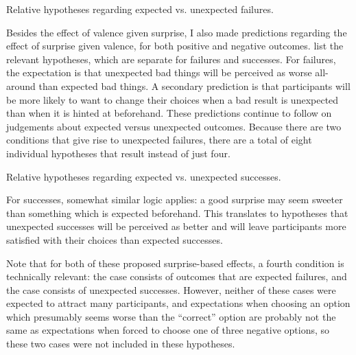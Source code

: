 \begin{table}[tb]
\centering
\bgroup
\def\arraystretch{1.3}
\setlength{\tabcolsep}{0.6em}

\egroup
\caption[Retrospective expected vs\@. unexpected failure hypotheses]{Relative hypotheses regarding expected vs\@. unexpected failures.}
\label{tab:e2-expected-vs-unexpected-failure-hypotheses}
\end{table}

Besides the effect of valence given surprise, I also made predictions regarding the effect of surprise given valence, for both positive and negative outcomes.
%
 list the relevant hypotheses, which are separate for failures and successes.
%
For failures, the expectation is that unexpected bad things will be perceived as worse all-around than expected bad things.
%
A secondary prediction is that participants will be more likely to want to change their choices when a bad result is unexpected than when it is hinted at beforehand.
%
These predictions continue to follow \citep{Shepperd2002} on judgements about expected versus unexpected outcomes.
%
Because there are two conditions that give rise to unexpected failures, there are a total of eight individual hypotheses that result instead of just four.

\begin{table}[tb]
\centering
\bgroup
\def\arraystretch{1.3}
\setlength{\tabcolsep}{0.6em}

\egroup
\caption[Retrospective expected vs\@. unexpected success hypotheses]{Relative hypotheses regarding expected vs\@. unexpected successes.}
\label{tab:e2-expected-vs-unexpected-success-hypotheses}
\end{table}

For successes, somewhat similar logic applies: a good surprise may seem sweeter than something which is expected beforehand.
%
This translates to hypotheses that unexpected successes will be perceived as better and will leave participants more satisfied with their choices than expected successes.


Note that for both of these proposed surprise-based effects, a fourth condition is technically relevant: the \obvsa{} case consists of outcomes that are expected failures, and the \obvfa{} case consists of unexpected successes.
%
However, neither of these cases were expected to attract many participants, and expectations when choosing an option which presumably seems worse than the ``correct'' option are probably not the same as expectations when forced to choose one of three negative options, so these two cases were not included in these hypotheses.


